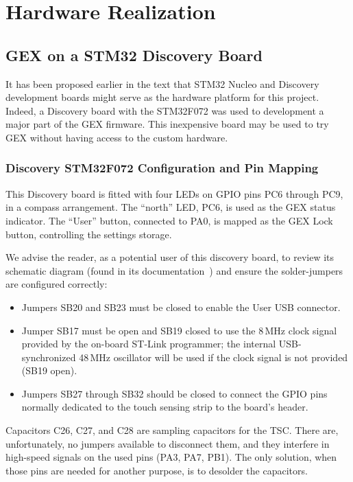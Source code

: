 \chapter{Hardware Realization} \label{sec:hwreal}

\section{GEX on a STM32 Discovery Board}

It has been proposed earlier in the text that STM32 Nucleo and Discovery development boards might serve as the hardware platform for this project. Indeed, a Discovery board with the STM32F072 was used to development a major part of the GEX firmware. This inexpensive board may be used to try GEX without having access to the custom hardware.

\subsection{Discovery STM32F072 Configuration and Pin Mapping}

This Discovery board is fitted with four \glspl{LED} on \gls{GPIO} pins PC6 through PC9, in a compass arrangement. The ``north'' \gls{LED}, PC6, is used as the GEX status indicator. The ``User'' button, connected to PA0, is mapped as the GEX Lock button, controlling the settings storage.

We advise the reader, as a potential user of this discovery board, to review its schematic diagram (found in its documentation~\cite{disco-f072}) and ensure the solder-jumpers are configured correctly:

\begin{itemize}
	\item Jumpers SB20 and SB23 must be closed to enable the User \gls{USB} connector.
	
	\item Jumper SB17 must be open and SB19 closed to use the 8\,MHz clock signal provided by the on-board ST-Link programmer; the internal USB-synchronized 48\,MHz oscillator will be used if the clock signal is not provided (SB19 open).
	
	\item Jumpers SB27 through SB32 should be closed to connect the \gls{GPIO} pins normally dedicated to the touch sensing strip to the board's header.
\end{itemize} 

Capacitors C26, C27, and C28 are sampling capacitors for the \gls{TSC}. There are, unfortunately, no jumpers available to disconnect them, and they interfere in high-speed signals on the used pins (PA3, PA7, PB1). The only solution, when those pins are needed for another purpose, is to desolder the capacitors.

